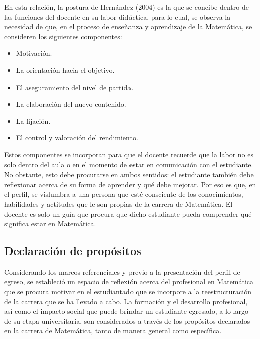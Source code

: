 En esta relación, la postura de Hernández (2004) es la que se concibe dentro de las funciones del docente en su labor didáctica, para lo cual, se observa la necesidad de que, en el proceso de enseñanza y aprendizaje de la Matemática, se consideren los siguientes componentes: 

\begin{itemize}
    
    \color{blue} \item \color{black} Motivación.

     \color{blue} \item \color{black} La orientación hacia el objetivo. 
     
    \color{blue} \item \color{black} El aseguramiento del nivel de partida. 
    
    \color{blue} \item \color{black} La elaboración del nuevo contenido.  
    
    \color{blue} \item \color{black} La fijación. 
    
    \color{blue} \item \color{black} El control y valoración del rendimiento.
    \end{itemize}

Estos componentes se incorporan para que el docente recuerde que la labor no es solo dentro del aula o en el momento de estar en comunicación con el estudiante. No obstante, esto debe procurarse en ambos sentidos: el estudiante también debe reflexionar acerca de su forma de aprender y qué debe mejorar. Por eso es que, en el perfil, se vislumbra a una persona que esté consciente de los conocimientos, habilidades y actitudes que le son propias de la carrera de Matemática. El docente es solo un guía que procura que dicho estudiante pueda comprender qué significa estar en Matemática.  

\subsection{Declaración de propósitos}

Considerando los marcos referenciales y previo a la presentación del perfil de egreso, se estableció un espacio de reflexión acerca del profesional en Matemática que se procura motivar en el estudiantado que se incorpore a la reestructuración de la carrera que se ha llevado a cabo. La formación y el desarrollo profesional, así como el impacto social que puede brindar un estudiante egresado, a lo largo de su etapa universitaria, son considerados a través de los propósitos declarados en la carrera de Matemática, tanto de manera general como específica. 

